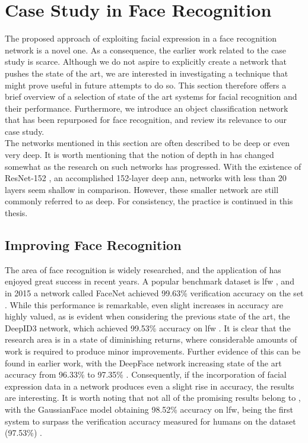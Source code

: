 \section{Case Study in Face Recognition}

The proposed approach of exploiting facial expression in a face recognition network is a novel one. As a consequence, the earlier work related to the case study is scarce. Although we do not aspire to explicitly create a network that pushes the state of the art, we are interested in investigating a technique that might prove useful in future attempts to do so. This section therefore offers a brief overview of a selection of state of the art systems for facial recognition and their performance. Furthermore, we introduce an object classification network that has been repurposed for face recognition, and review its relevance to our case study. \\

\noindent The networks mentioned in this section are often described to be deep or even very deep. It is worth mentioning that the notion of depth in  has changed somewhat as the research on such networks has progressed. With the existence of ResNet-152 \cite{resnet}, an accomplished 152-layer deep \acrshort{ann}, networks with less than 20 layers seem shallow in comparison. However, these smaller network are still commonly referred to as deep. For consistency, the practice is continued in this thesis. 

\subsection{Improving Face Recognition} \label{sec:improving-face-recognition}

The area of face recognition is widely researched, and the application of  has enjoyed great success in recent years. A popular benchmark dataset is \acrfull{lfw} \cite{lfw}, and in 2015 a network called FaceNet achieved 99.63\% verification accuracy on the set \cite{facenet}. While this performance is remarkable, even slight increases in accuracy are highly valued, as is evident when considering the previous state of the art, the DeepID3 network, which achieved 99.53\% accuracy on \acrshort{lfw} \cite{deepid3}. It is clear that the research area is in a state of diminishing returns, where considerable amounts of work is required to produce minor improvements. Further evidence of this can be found in earlier work, with the DeepFace network increasing state of the art accuracy from 96.33\% to 97.35\% \cite{deepface}. Consequently, if the incorporation of facial expression data in a network produces even a slight rise in accuracy, the results are interesting. It is worth noting that not all of the promising results belong to , with the GaussianFace model obtaining 98.52\% accuracy on \acrshort{lfw}, being the first system to surpass the verification accuracy measured for humans on the dataset (97.53\%) \cite{gaussianface}.

